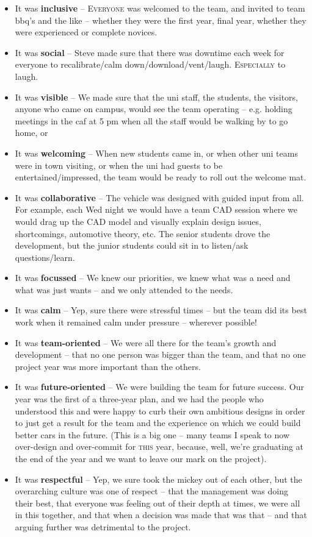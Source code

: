 \documentclass[10pt, a4paper, article, oneside, twocolumn, final]{memoir}
\begin{document}
\begin{itemize}
    \item It was \textbf{inclusive} -- \textsc{Everyone} was welcomed to the team, and invited to team bbq’s and the like -- whether they were the first year, final year, whether they were experienced or complete novices.
    \item It was \textbf{social} -- Steve made sure that there was downtime each week for everyone to recalibrate/\allowbreak calm down/\allowbreak download/\allowbreak vent/\allowbreak laugh. \textsc{Especially} to laugh. 
    \item It was \textbf{visible} -- We made sure that the uni staff, the students, the visitors, anyone who came on campus, would see the team operating -- e.g. holding meetings in the caf at 5 pm when all the staff would be walking by to go home, or 
    \item It was \textbf{welcoming} -- When new students came in, or when other uni teams were in town visiting, or when the uni had guests to be entertained/\allowbreak impressed, the team would be ready to roll out the welcome mat. 
    \item It was \textbf{collaborative} -- The vehicle was designed with guided input from all. For example, each Wed night we would have a team CAD session where we would drag up the CAD model and visually explain design issues, shortcomings, automotive theory, etc. The senior students drove the development, but the junior students could sit in to listen/\allowbreak ask questions/\allowbreak learn. 
    \item It was \textbf{focussed} -- We knew our priorities, we knew what was a need and what was just wants -- and we only attended to the needs.
    \item It was \textbf{calm} -- Yep, sure there were stressful times -- but the team did its best work when it remained calm under pressure -- wherever possible! 
    \item It was \textbf{team-oriented} -- We were all there for the team’s growth and development -- that no one person was bigger than the team, and that no one project year was more important than the others. 
    \item It was \textbf{future-oriented} -- We were building the team for future success. Our year was the first of a three-year plan, and we had the people who understood this and were happy to curb their own ambitious designs in order to just get a result for the team and the experience on which we could build better cars in the future. (This is a big one -- many teams I speak to now over-design and over-commit for \textsc{this} year, because, well, we’re graduating at the end of the year and we want to leave our mark on the project).
    \item It was \textbf{respectful} -- Yep, we sure took the mickey out of each other, but the overarching culture was one of respect -- that the management was doing their best, that everyone was feeling out of their depth at times, we were all in this together, and that when a decision was made that was that -- and that arguing further was detrimental to the project. 
\end{itemize}
\end{document}
